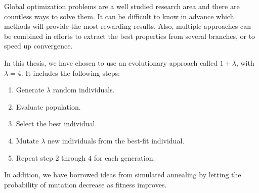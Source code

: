 Global optimization problems are a well studied research area and there are
countless ways to solve them. It can be difficult to know in advance which
methods will provide the most rewarding results. Also, multiple approaches can
be combined in efforts to extract the best properties from several branches, or
to speed up convergence.

In this thesis, we have chosen to use an evolutionary approach called $1 +
\lambda$, with $\lambda = 4$. It includes the following steps:

\begin{enumerate}
    \item Generate $\lambda$ random individuals.
    \item Evaluate population.
    \item Select the best individual.
    \item Mutate $\lambda$ new individuals from the best-fit individual.
    \item Repeat step 2 through 4 for each generation.
\end{enumerate}

In addition, we have borrowed ideas from simulated annealing by letting the
probability of mutation decrease as fitness improves.
